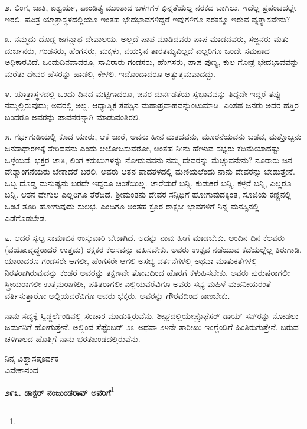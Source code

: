 ೨. ಲಿಂಗ, ಜಾತಿ, ಐಶ್ವರ್ಯ, ಪಾಂಡಿತ್ಯ ಮುಂತಾದ ಬಳಗಗಳ ಭಿನ್ನತೆಯೆಲ್ಲ ನರಕದ ಬಾಗಿಲು. ಇದೆಲ್ಲ ಪ್ರಪಂಚದಲ್ಲೇ ಇರಲಿ. ಪವಿತ್ರ ಯಾತ್ರಾಸ್ಥಳದಲ್ಲಿಯೂ ಇಂತಹ ಭೇದಭಾವಗಳಿದ್ದರೆ ಇವುಗಳಿಗೂ ನರಕಕ್ಕೂ ಇರುವ ವ್ಯತ್ಯಾಸವೇನು?

೩. ನಮ್ಮದು ದೊಡ್ಡ ಜಗನ್ನಾಥ ದೇವಾಲಯ. ಅಲ್ಲದೆ ಪಾಪ ಮಾಡಿದವರು ಪಾಪ ಮಾಡದವರು, ಸಜ್ಜನರು ಮತ್ತು ದುರ್ಜನರು, ಗಂಡಸರು, ಹೆಂಗಸರು, ಮಕ್ಕಳು, ವಯಸ್ಸಿನ ತಾರತಮ್ಯವಿಲ್ಲದೆ ಎಲ್ಲರಿಗೂ ಒಂದೇ ಸಮನಾದ ಅಧಿಕಾರವಿದೆ. ಒಂದು\break ದಿನವಾದರೂ, ಸಾವಿರಾರು ಗಂಡಸರು, ಹೆಂಗಸರು, ಪಾಪ ಪುಣ್ಯ, ಕುಲ ಗೋತ್ರ ಭೇದಭಾವವನ್ನು ಮರೆತು ದೇವರ ಹೆಸರನ್ನು ಹಾಡಲಿ, ಕೇಳಲಿ. ಇದೊಂದಾದರೂ ಅತ್ಯುತ್ತಮವಾದದ್ದು.

೪. ಯಾತ್ರಾಸ್ಥಳದಲ್ಲಿ ಒಂದು ದಿನದ ಮಟ್ಟಿಗಾದರೂ, ಜನರ ದುರ್ನಡತೆಯ ಸ್ವಭಾವವನ್ನು ತಿದ್ದದೇ ಇದ್ದರೆ ತಪ್ಪು ನಮ್ಮಲ್ಲಿರುವುದು; ಅವರಲ್ಲಿ ಅಲ್ಲ. ಆಧ್ಯಾತ್ಮಿಕ ತಪಸ್ಸಿನ ಮಹಾಪ್ರವಾಹವನ್ನುಂಟುಮಾಡಿ. ಎಂತಹ ಜನರು ಅದರ ಹತ್ತಿರ ಬಂದರೂ ಅವರನ್ನು ಪಾವನರನ್ನಾಗಿ ಮಾಡುವಂತಿರಲಿ.

೫. ಗರ್ಭಗುಡಿಯಲ್ಲಿ ಕೂಡ ಯಾರು, ಆಕೆ ಜಾರೆ, ಅವನು ಹೀನ ಮತದವನು, ಮೂರನೆಯವನು ಬಡವ, ಮತ್ತೊಬ್ಬನು ಜನಸಾಧಾರಣಕ್ಕೆ ಸೇರಿದವನು ಎಂದು ಆಲೋಚಿಸುವರೋ, ಅಂತಹ ನೀನು ಹೇಳುವ ಸಭ್ಯರು ಕಡಿಮೆಯಾದಷ್ಟು ಒಳ್ಳೆಯದೆ. ಭಕ್ತರ ಜಾತಿ, ಲಿಂಗ ಕಸುಬುಗಳನ್ನು ನೋಡುವವನು ನಮ್ಮ ದೇವರನ್ನು ಮೆಚ್ಚುವನೇನು? ನೂರಾರು ಜನ ವೇಶ್ಯಾಂಗನೆಯರು ಬೇಕಾದರೆ ಬರಲಿ. ಅವರು ಆತನ ಪಾದತಳದಲ್ಲಿ ಮಣಿಯಲೆಂದು ನಾನು ದೇವರನ್ನು ಬೇಡುತ್ತೇನೆ. ಒಬ್ಬ ದೊಡ್ಡ ಮನುಷ್ಯನು ಬರದೇ ಇದ್ದರೂ ಚಿಂತೆಯಿಲ್ಲ. ಜಾರೆಯರೆ ಬನ್ನಿ, ಕುಡುಕರೆ ಬನ್ನಿ, ಕಳ್ಳರೆ ಬನ್ನಿ, ಎಲ್ಲರೂ ಬನ್ನಿ. ಆತನ ದೇಗುಲ ಎಲ್ಲರಿಗೂ ತೆರೆದಿದೆ. ಶ‍್ರೀಮಂತನು ದೇವರ ಸನ್ನಿಧಿಗೆ ಹೋಗುವುದಕ್ಕಿಂತ, ಸೂಜಿಯ ಕಣ್ಣಿನಲ್ಲಿ ಒಂಟೆ ತೂರಿ ಹೋಗುವುದು ಸುಲಭ. ಎಂದಿಗೂ ಅಂತಹ ಕ್ರೂರ ರಾಕ್ಷಸೀ ಭಾವಗಳಿಗೆ ನಿನ್ನ ಮನಸ್ಸಿನಲ್ಲಿ ಎಡೆಗೊಡಬೇಡ.

೬. ಆದರೆ ಸ್ವಲ್ಪ ಸಾಮಾಜಿಕ ಉಸ್ತುವಾರಿ ಬೇಕಾಗಿದೆ. ಅದನ್ನು ನಾವು ಹೀಗೆ ಮಾಡಬೇಕು. ಅಂದಿನ ದಿನ ಕೆಲವರು (ವಯೋವೃದ್ಧರಾದರೆ ಉತ್ತಮ) ರಕ್ಷಕರ ಕೆಲಸವನ್ನು ವಹಿಸಬೇಕು. ಅವರು ಉತ್ಸವ ನಡೆಯುವ ಕಡೆಯಲ್ಲೆಲ್ಲ ತಿರುಗಾಡಿ, ಯಾರಾದರೂ ಗಂಡಸರೇ ಆಗಲೀ, ಹೆಂಗಸರೇ ಆಗಲಿ ಅಸಭ್ಯ ವರ್ತನೆಗಳಲ್ಲಿ ಅಥವಾ ಮಾತುಕತೆಗಳಲ್ಲಿ ನಿರತರಾಗಿರುವುದನ್ನು ಕಂಡರೆ ಅವರನ್ನು ತಕ್ಷಣವೇ ತೋಟದಿಂದ ಹೊರಗೆ ಕಳುಹಿಸಬೇಕು. ಅವರು ಪುರುಷರಾಗಲೀ ಸ್ತ್ರೀಯರಾಗಲೀ ಉತ್ತಮರಾಗಲೀ, ಪತಿತರಾಗಲೀ ಎಲ್ಲಿಯವರೆವಿಗೂ ಅವರು ಸಭ್ಯ ಮಹಿಳೆ ಮಹನೀಯರಂತೆ ವರ್ತಿಸುತ್ತಾರೋ ಅಲ್ಲಿಯವರೆವಿಗೂ ಅವರು ಭಕ್ತರು. ಅವರನ್ನು ಗೌರವದಿಂದ ಕಾಣಬೇಕು.

ನಾನು ಸದ್ಯಕ್ಕೆ ಸ್ವಿಡ್ಜರ್ಲೆಂಡಿನಲ್ಲಿ ಸಂಚಾರ ಮಾಡುತ್ತಿರುವೆನು. ಶೀಘ್ರದಲ್ಲಿಯೇ\break ಪ್ರೊಫೆಸರ್ ಡಾಯ್ ಸನ್‌ರನ್ನು ನೋಡಲು ಜರ್ಮನಿಗೆ ಹೋಗುತ್ತೇನೆ. ಅಲ್ಲಿಂದ ಸೆಪ್ಟೆಂಬರ್ ೨೩ ಅಥವಾ ೨೪ನೇ ತಾರೀಖು ಇಂಗ್ಲೆಂಡಿಗೆ ಹಿಂತಿರುಗುತ್ತೇನೆ. ಬರುವ ಚಳಿಗಾಲದ ಹೊತ್ತಿಗೆ ನಾನು ಭರತಖಂಡದಲ್ಲಿರುವೆನು.

{\flushright
ನಿನ್ನ ವಿಶ್ವಾಸಪೂರ್ವಕ\\ವಿವೇಕಾನಂದ\par}

\begin{center}
\textbf{೨೯೩. ಡಾಕ್ಟರ್ ನಂಜುಂಡರಾವ್ ಅವರಿಗೆ}\footnote{}
\end{center}

